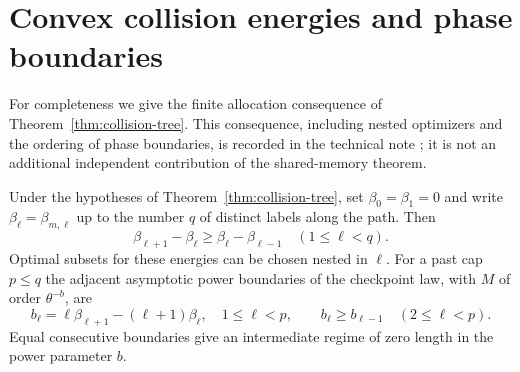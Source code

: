\section{Convex collision energies and phase boundaries}\label{sec:tree-convexity}
For completeness we give the finite allocation consequence of
Theorem~\ref{thm:collision-tree}. This consequence, including nested
optimizers and the ordering of phase boundaries, is recorded in the
technical note \cite{A1v9note}; it is not an additional independent
contribution of the shared-memory theorem.

\begin{proposition}\label{prop:tree-convexity}
Under the hypotheses of Theorem~\ref{thm:collision-tree}, set
$\beta_0=\beta_1=0$ and write $\beta_\ell=\beta_{m,\ell}$ up to
the number $q$ of distinct labels along the path. Then
\[
 \beta_{\ell+1}-\beta_\ell\ge\beta_\ell-\beta_{\ell-1}
                 \quad(1\le\ell<q).
\]
Optimal subsets for these energies can be chosen nested in $\ell$.
For a past cap $p\le q$ the adjacent asymptotic power boundaries of the
checkpoint law, with $M$ of order $\theta^{-b}$, are
\begin{equation}\label{eq:convex-phase-boundaries}
 b_\ell=\ell\beta_{\ell+1}-(\ell+1)\beta_\ell,
       \quad1\le\ell<p,
 \qquad b_\ell\ge b_{\ell-1}\quad(2\le\ell<p).
\end{equation}
Equal consecutive boundaries give an intermediate regime of zero
length in the power parameter $b$.
\end{proposition}

